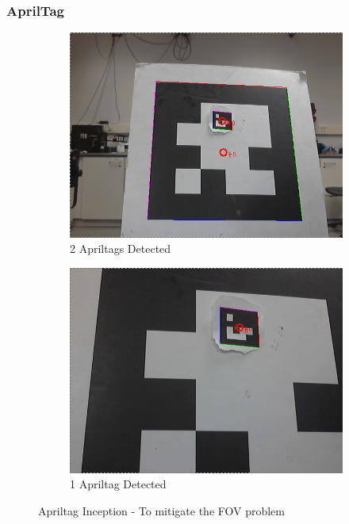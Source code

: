\documentclass[11pt, twocolumn]{article}
\begin{document}
\subsubsection{AprilTag}
\begin{figure}[H]
	\centering
	\begin{subfigure}[b]{0.45\linewidth}
		\includegraphics[width=\textwidth]{images/apriltags_1.png}
		\caption{2 Apriltags Detected}
	\end{subfigure}
	\begin{subfigure}[b]{0.45\linewidth}
		\includegraphics[width=\textwidth]{images/apriltags_3.png}
		\caption{1 Apriltag Detected }
	\end{subfigure}
	\caption{Apriltag Inception - To mitigate the FOV problem}
	\label{fig:apriltag}
\end{figure}
\end{document}
